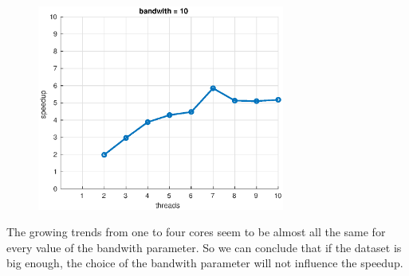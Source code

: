\documentclass[10pt,twocolumn,letterpaper]{article}
\begin{document}
\begin{figure}[H]
\centering
\includegraphics[width=3.2in]{fig/speedup10b.eps}
\end{figure}

The growing trends from one to four cores seem to be almost all the same for every value of the bandwith parameter. So we can conclude that if the dataset is big enough, the choice of the bandwith parameter will not influence the speedup.
\end{document}
